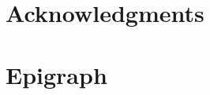   \newcommand{\CustomAcknowledgePage}{
  \chapter*{Acknowledgments}

  \@acknowledgments
  }
  
  \newcommand{\CustomEpigraphPage}{
  \chapter*{Epigraph}

  \@epigraphpage
  }
\makeatother

\ifissubmit
  \makeintropages
\else
  \makeatletter
    \CustomTitlePage
    \@makecopyrightpage
    \@makededication
    \tableofcontents
    \listoffigures
    \listoftables
    \cleardoublepage
    \CustomAcknowledgePage
    \CustomEpigraphPage

    \cleardoublepage
    \pagestyle{headings}
    \setcounter{page}{1}
  \makeatother
\fi


